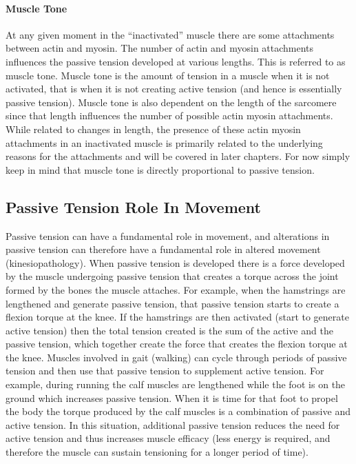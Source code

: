 \paragraph{Muscle Tone}
At any given moment in the “inactivated” muscle there are some attachments between actin and myosin. The number of actin and myosin attachments influences the passive tension developed at various lengths. This is referred to as muscle tone. Muscle tone is the amount of tension in a muscle when it is not activated, that is when it is not creating active tension (and hence is essentially passive tension). Muscle tone is also dependent on the length of the sarcomere since that length influences the number of possible actin myosin attachments. While related to changes in length, the presence of these actin myosin attachments in an inactivated muscle is primarily related to the underlying reasons for the attachments and will be covered in later chapters. For now simply keep in mind that muscle tone is directly proportional to passive tension.

\subsection{Passive Tension Role In Movement}
Passive tension can have a fundamental role in movement, and alterations in passive tension can therefore have a fundamental role in altered movement (kinesiopathology). When passive tension is developed there is a force developed by the muscle undergoing passive tension that creates a torque across the joint formed by the bones the muscle attaches. For example, when the hamstrings are lengthened and generate passive tension, that passive tension starts to create a flexion torque at the knee. If the hamstrings are then activated (start to generate active tension) then the total tension created is the sum of the active and the passive tension, which together create the force that creates the flexion torque at the knee. Muscles involved in gait (walking) can cycle through periods of passive tension and then use that passive tension to supplement active tension. For example, during running the calf muscles are lengthened while the foot is on the ground which increases passive tension. When it is time for that foot to propel the body the torque produced by the calf muscles is a combination of passive and active tension. In this situation, additional passive tension reduces the need for active tension and thus increases muscle efficacy (less energy is required, and therefore the muscle can sustain tensioning for a longer period of time).

